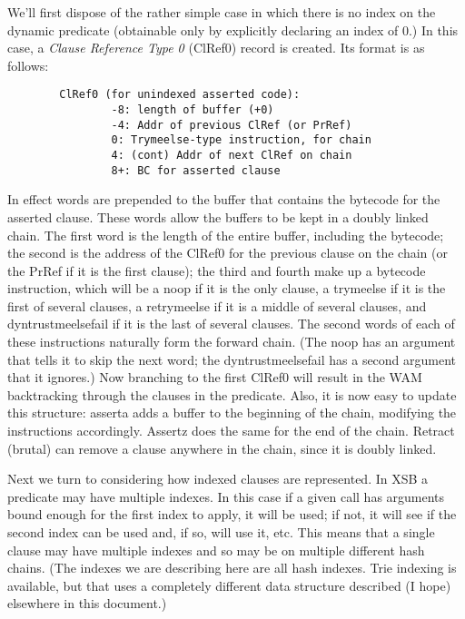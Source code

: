 \documentclass[11pt]{article}
\begin{document}
We'll first dispose of the rather simple case in which there is no
index on the dynamic predicate (obtainable only by explicitly
declaring an index of 0.)  In this case, a {\em Clause Reference Type
0} (ClRef0) record is created.  Its format is as follows:
\begin{verbatim}
        ClRef0 (for unindexed asserted code):
                -8: length of buffer (+0)
                -4: Addr of previous ClRef (or PrRef)
                0: Trymeelse-type instruction, for chain
                4: (cont) Addr of next ClRef on chain
                8+: BC for asserted clause
\end{verbatim}
In effect words are prepended to the buffer that contains the bytecode
for the asserted clause.  These words allow the buffers to be kept in
a doubly linked chain.  The first word is the length of the entire
buffer, including the bytecode; the second is the address of the
ClRef0 for the previous clause on the chain (or the PrRef if it is the
first clause); the third and fourth make up a bytecode instruction,
which will be a noop if it is the only clause, a trymeelse if it is
the first of several clauses, a retrymeelse if it is a middle of
several clauses, and dyntrustmeelsefail if it is the last of several
clauses.  The second words of each of these instructions naturally
form the forward chain.  (The noop has an argument that tells it to
skip the next word; the dyntrustmeelsefail has a second argument that
it ignores.)  Now branching to the first ClRef0 will result in the WAM
backtracking through the clauses in the predicate.  Also, it is now
easy to update this structure: asserta adds a buffer to the beginning
of the chain, modifying the instructions accordingly.  Assertz does
the same for the end of the chain.  Retract (brutal) can remove a
clause anywhere in the chain, since it is doubly linked.

Next we turn to considering how indexed clauses are represented.  In
XSB a predicate may have multiple indexes.  In this case if a given
call has arguments bound enough for the first index to apply, it will
be used; if not, it will see if the second index can be used and, if
so, will use it, etc.  This means that a single clause may have
multiple indexes and so may be on multiple different hash chains.
(The indexes we are describing here are all hash indexes.  Trie
indexing is available, but that uses a completely different data
structure described (I hope) elsewhere in this document.)
\end{document}
